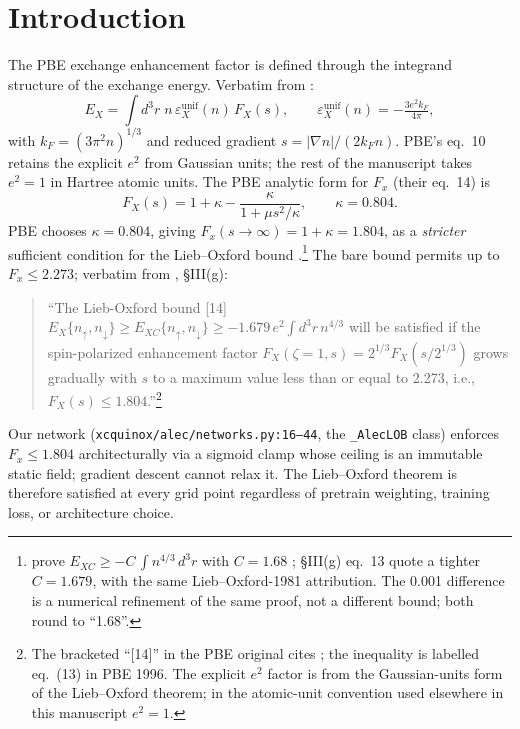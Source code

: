 \documentclass[11pt,letterpaper]{article}
\begin{document}
\section{Introduction}
\label{sec:intro}

The PBE exchange enhancement factor is defined through the integrand structure of the
exchange energy. Verbatim from \citet[eq.~10]{PerdewBurkeErnzerhof1996}:
\begin{equation}
\label{eq:Ex_integrand}
E_X = \int d^3 r\; n\, \varepsilon_X^{\mathrm{unif}}(n)\, F_X(s),
\qquad
\varepsilon_X^{\mathrm{unif}}(n) = -\tfrac{3 e^2 k_F}{4\pi},
\end{equation}
with $k_F = (3\pi^2 n)^{1/3}$ and reduced gradient $s = |\nabla n|/(2 k_F n)$.
PBE's eq.~10 retains the explicit $e^2$ from Gaussian units; the rest of the manuscript
takes $e^2 = 1$ in Hartree atomic units. The PBE analytic form for $F_x$
(their eq.~14) is
\begin{equation}
\label{eq:PBE_Fx}
F_X(s) = 1 + \kappa - \frac{\kappa}{1 + \mu s^2/\kappa},
\qquad \kappa = 0.804.
\end{equation}
PBE chooses $\kappa = 0.804$, giving $F_x(s\!\to\!\infty) = 1+\kappa = 1.804$, as a
\emph{stricter} sufficient condition for the Lieb--Oxford bound
\citep{LiebOxford1981}.\footnote{\citet{LiebOxford1981} prove
$E_{XC} \ge -C\,\int n^{4/3}\, d^3 r$ with $C = 1.68$
\citep[their \S 2, eqs.~(26)--(27)]{LiebOxford1981}; \citet{PerdewBurkeErnzerhof1996}
\S III(g) eq.~13 quote a tighter $C = 1.679$, with the same Lieb--Oxford-1981
attribution. The 0.001 difference is a numerical refinement of the same proof,
not a different bound; both round to ``1.68''.}
The bare bound permits up to $F_x \le 2.273$; verbatim from
\citet{PerdewBurkeErnzerhof1996}, \S III(g):
\begin{quote}
``The Lieb-Oxford bound [14]
$E_X\{n_\uparrow,n_\downarrow\}\geq E_{XC}\{n_\uparrow,n_\downarrow\}\geq -1.679\, e^{2}\int d^3 r\, n^{4/3}$
will be satisfied if the spin-polarized enhancement factor
$F_X(\zeta=1, s) = 2^{1/3} F_X(s/2^{1/3})$ grows gradually with $s$ to a maximum value
less than or equal to 2.273, i.e., $F_X(s) \le 1.804$.''\footnote{The bracketed
``[14]'' in the PBE original cites \citet{LiebOxford1981}; the inequality is
labelled eq.~(13) in PBE 1996. The explicit $e^2$ factor is from the
Gaussian-units form of the Lieb--Oxford theorem; in the atomic-unit convention
used elsewhere in this manuscript $e^2 = 1$.}
\end{quote}
Our network (\texttt{xcquinox/alec/networks.py:16--44}, the
\texttt{\_AlecLOB} class) enforces $F_x \le 1.804$
architecturally via a sigmoid clamp whose ceiling is an immutable static field; gradient
descent cannot relax it. The Lieb--Oxford theorem is therefore satisfied at every grid
point regardless of pretrain weighting, training loss, or architecture choice.
\end{document}
